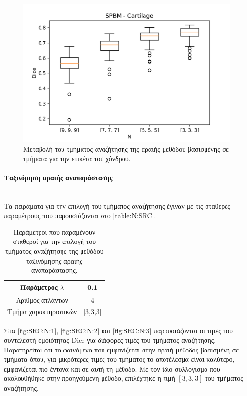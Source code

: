 \documentclass[a4paper,12pt]{article}
\newcommand{\paragraphLine}[1]{\paragraph{#1}\mbox{}\\}
\begin{document}
\begin{figure}[H]
    \centering
    \includegraphics[width=0.85\linewidth]{SPBM_N_Cartilage_plot.png}
    \caption{Μεταβολή του τμήματος αναζήτησης της αραιής μεθόδου βασισμένης σε
             τμήματα για την ετικέτα του χόνδρου.}
    \label{fig:SPBM:N:3}
\end{figure}

\paragraphLine{Ταξινόμηση αραιής αναπαράστασης}

Τα πειράματα για την επιλογή του τμήματος αναζήτησης έγιναν με τις σταθερές
παραμέτρους που παρουσιάζονται στο \autoref{table:N:SRC}.

\begin{table}[h!]
    \centering
    \begin{tabular}{|c|c|} 
        \hline
        Παράμετρος $\lambda$ & 0.1 \\ 
        \hline
        Αριθμός ατλάντων & 4 \\ 
        \hline
        Τμήμα χαρακτηριστικών & [3,3,3] \\ 
        \hline
    \end{tabular}
    \caption{Παράμετροι που παραμένουν σταθεροί για την επιλογή του τμήματος
             αναζήτησης της μεθόδου ταξινόμησης αραιής αναπαράστασης.}
    \label{table:N:SRC}
\end{table}

Στα \autoref{fig:SRC:N:1}, \autoref{fig:SRC:N:2} και \autoref{fig:SRC:N:3}
παρουσιάζονται οι τιμές του συντελεστή ομοιότητας Dice για διάφορες τιμές του
τμήματος αναζήτησης. Παρατηρείται ότι το φαινόμενο που εμφανίζεται στην αραιή
μέθοδος βασισμένη σε τμήματα όπου, για μικρότερες τιμές του τμήματος το
αποτέλεσμα είναι καλύτερο, εμφανίζεται πιο έντονα και σε αυτή τη μέθοδο. Με τον
ίδιο συλλογισμό που ακολουθήθηκε στην προηγούμενη μέθοδο, επιλέχτηκε η τιμή
$[3,3,3]$ του τμήματος αναζήτησης.
\end{document}
